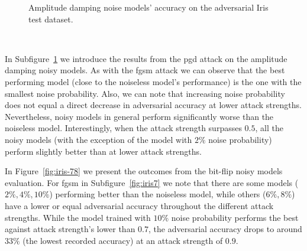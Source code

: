 \begin{figure}[!h]
\begin{subfigure}{0.45\textwidth}
      \label{fig:iris6}
  \end{subfigure}
  \caption{Amplitude damping noise models' accuracy on the adversarial Iris test dataset.}
  \label{fig:iris-56}
\end{figure} \

In Subfigure~\ref{fig:iris6} we introduce the results from the \ac{pgd}
attack on the amplitude damping noisy models. As with the \ac{fgsm} attack
we can observe that the best performing model (close to the noiseless
model's performance) is the one with the smallest noise probability. Also,
we can note that increasing noise probability does not equal a direct
decrease in adversarial accuracy at lower attack strengths. Nevertheless,
noisy models in general perform significantly worse than the noiseless
model. Interestingly, when the attack strength surpasses \(0.5\), all
the noisy models (with the exception of the model with \(2\%\) noise
probability) perform slightly better than at lower attack strengths. \

In Figure~\ref{fig:iris-78} we present the outcomes from the bit-flip
noisy models evaluation. For \ac{fgsm} in Subfigure~\ref{fig:iris7}
we note that there are some models (\(2\%, 4\%, 10\%\)) performing
better than the noiseless model, while others (\(6\%, 8\%\)) have
a lower or equal adversarial accuracy throughout the different
attack strengths. While the model trained with \(10\%\) noise
probability performs the best against attack strength's lower
than \(0.7\), the adversarial accuracy drops to around \(33\%\)
(the lowest recorded accuracy) at an attack strength of \(0.9\). \

